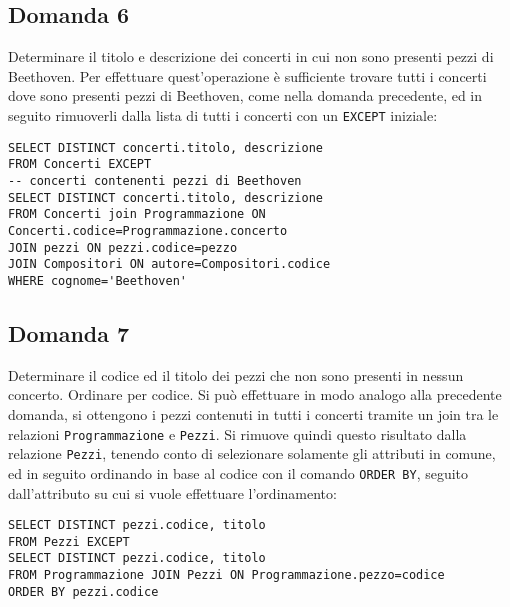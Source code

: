 \documentclass{article}
\numberwithin{equation}{subsection}
\begin{document}
\subsection*{Domanda 6}
Determinare il titolo e descrizione dei concerti in cui non sono presenti pezzi di Beethoven. Per effettuare quest'operazione è sufficiente trovare tutti i concerti dove sono presenti 
pezzi di Beethoven, come nella domanda precedente, ed in seguito rimuoverli dalla lista di tutti i concerti con un \verb|EXCEPT| iniziale:
\begin{verbatim}
SELECT DISTINCT concerti.titolo, descrizione
FROM Concerti EXCEPT
-- concerti contenenti pezzi di Beethoven
SELECT DISTINCT concerti.titolo, descrizione 
FROM Concerti join Programmazione ON Concerti.codice=Programmazione.concerto
JOIN pezzi ON pezzi.codice=pezzo
JOIN Compositori ON autore=Compositori.codice
WHERE cognome='Beethoven'
\end{verbatim}

\subsection*{Domanda 7}
Determinare il codice ed il titolo dei pezzi che non sono presenti in nessun concerto. Ordinare per codice. Si può effettuare in modo analogo alla precedente domanda, si ottengono i pezzi contenuti in tutti i 
concerti tramite un join tra le relazioni \verb|Programmazione| e \verb|Pezzi|. Si rimuove quindi questo risultato dalla relazione \verb|Pezzi|, tenendo conto di selezionare solamente gli attributi in comune, ed 
in seguito ordinando in base al codice con il comando \verb|ORDER BY|, seguito dall'attributo su cui si vuole effettuare l'ordinamento: 
\begin{verbatim}
SELECT DISTINCT pezzi.codice, titolo
FROM Pezzi EXCEPT
SELECT DISTINCT pezzi.codice, titolo
FROM Programmazione JOIN Pezzi ON Programmazione.pezzo=codice
ORDER BY pezzi.codice 
\end{verbatim}
\end{document}
